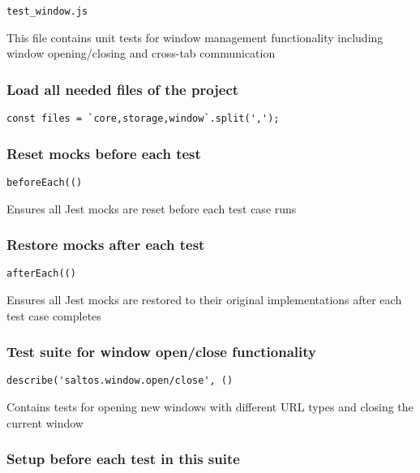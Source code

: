 \documentclass[a4paper]{article}
\begin{document}
\begin{lstlisting}
test_window.js
\end{lstlisting}

This file contains unit tests for window management functionality
including window opening/closing and cross-tab communication

\hypertarget{toc283}{}
\subsubsection{Load all needed files of the project}

\begin{lstlisting}
const files = `core,storage,window`.split(',');
\end{lstlisting}

\hypertarget{toc284}{}
\subsubsection{Reset mocks before each test}

\begin{lstlisting}
beforeEach(()
\end{lstlisting}

Ensures all Jest mocks are reset before each test case runs

\hypertarget{toc285}{}
\subsubsection{Restore mocks after each test}

\begin{lstlisting}
afterEach(()
\end{lstlisting}

Ensures all Jest mocks are restored to their original implementations
after each test case completes

\hypertarget{toc286}{}
\subsubsection{Test suite for window open/close functionality}

\begin{lstlisting}
describe('saltos.window.open/close', ()
\end{lstlisting}

Contains tests for opening new windows with different URL types
and closing the current window

\hypertarget{toc287}{}
\subsubsection{Setup before each test in this suite}
\end{document}
